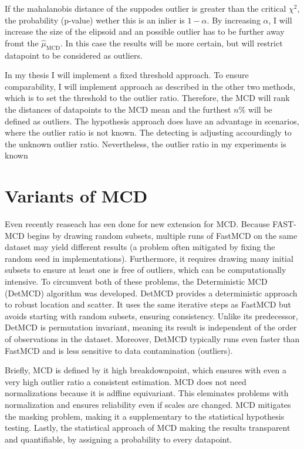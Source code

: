 If the mahalanobis distance of the suppodes outlier is greater than the critical $\chi^2$, the probability (p-value) wether this is an inlier is $1- \alpha$.
By increasing $\alpha$, I will increase the size of the elipsoid and an possible outlier has to be further away fromt the $\hat{\mu}_{\text{MCD}}$.
In this case the results will be more certain, but will restrict datapoint to be considered as outliers.


In my thesis I will implement a fixed threshold approach.
To ensure comparability, I will implement approach as described in the other two methods, which is to set the threshold to the outlier ratio.
Therefore, the MCD will rank the distances of datapoints to the MCD mean and the furthest $n\%$ will be defined as outliers.
The hypothesis approach does have an advantage in scenarios, where the outlier ratio is not known.
The detecting is adjusting accourdingly to the unknown outlier ratio.
Nevertheless, the outlier ratio in my experiments is known 


\section*{Variants of MCD}
Even recently reaseach has een done for new extension for MCD.
Because FAST-MCD begins by drawing random subsets, multiple runs of FastMCD on the same dataset may yield different results (a problem often mitigated by fixing the random seed in implementations). 
Furthermore, it requires drawing many initial subsets to ensure at least one is free of outliers, which can be computationally intensive. 
To circumvent both of these problems, the Deterministic MCD (DetMCD) algorithm was developed. \citep[p.621 pp.]{hubert2012deterministic}
DetMCD provides a deterministic approach to robust location and scatter. 
It uses the same iterative steps as FastMCD but avoids starting with random subsets, ensuring consistency. 
Unlike its predecessor, DetMCD is permutation invariant, meaning its result is independent of the order of observations in the dataset. 
Moreover, DetMCD typically runs even faster than FastMCD and is less sensitive to data contamination (outliers).


Briefly, MCD is defined by it high breakdownpoint, which ensures with even a very high outlier ratio a consistent estimation.
MCD does not need normalizations because it is adffine equivariant. 
This eleminates problems with normalization and ensures reliability even if scales are changed.
MCD mitigates the masking problem, making it a supplementary to the statistical hypothesis testing.
Lastly, the statistical approach of MCD making the results transparent and quantifiable, by assigning a probability to every datapoint.


